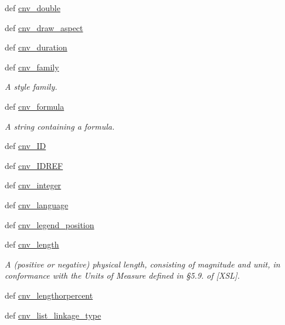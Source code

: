 \begin{DoxyCompactItemize}
def \hyperlink{namespaceodf_1_1attrconverters_a44f79a4789d779673035256dd4deb261}{cnv\+\_\+double}
\item 
def \hyperlink{namespaceodf_1_1attrconverters_a3c0258736ed5a7bb04f1f51ff38546d6}{cnv\+\_\+draw\+\_\+aspect}
\item 
def \hyperlink{namespaceodf_1_1attrconverters_ae8072f5285a3c17644fd7935f2266064}{cnv\+\_\+duration}
\item 
def \hyperlink{namespaceodf_1_1attrconverters_aa936da0d71919237fa09837e87294eb6}{cnv\+\_\+family}
\begin{DoxyCompactList}\small\item\em A style family. \end{DoxyCompactList}\item 
def \hyperlink{namespaceodf_1_1attrconverters_a00d69f28dc9d13f042e8d620da46cfcf}{cnv\+\_\+formula}
\begin{DoxyCompactList}\small\item\em A string containing a formula. \end{DoxyCompactList}\item 
def \hyperlink{namespaceodf_1_1attrconverters_a38cada2f52ab78cf1424512f5183a76d}{cnv\+\_\+\+I\+D}
\item 
def \hyperlink{namespaceodf_1_1attrconverters_aff0bfee5a6072a874d69feab04c518b2}{cnv\+\_\+\+I\+D\+R\+E\+F}
\item 
def \hyperlink{namespaceodf_1_1attrconverters_aa7f14422addfe6d389fb4be4a8390de2}{cnv\+\_\+integer}
\item 
def \hyperlink{namespaceodf_1_1attrconverters_a9954094e0e42fe13c1b9a6dcfccc35d2}{cnv\+\_\+language}
\item 
def \hyperlink{namespaceodf_1_1attrconverters_a5b803af5f991ad48f57c0a85c61e018e}{cnv\+\_\+legend\+\_\+position}
\item 
def \hyperlink{namespaceodf_1_1attrconverters_a4fde729e3a01d33ab946fb3ca8e1b1f1}{cnv\+\_\+length}
\begin{DoxyCompactList}\small\item\em A (positive or negative) physical length, consisting of magnitude and unit, in conformance with the Units of Measure defined in §5.9. of \mbox{[}X\+S\+L\mbox{]}. \end{DoxyCompactList}\item 
def \hyperlink{namespaceodf_1_1attrconverters_adacce981267c9e1805396813a193b5db}{cnv\+\_\+lengthorpercent}
\item 
def \hyperlink{namespaceodf_1_1attrconverters_a14106eb750692910238b08052b753f99}{cnv\+\_\+list\+\_\+linkage\+\_\+type}

\end{DoxyCompactItemize}
